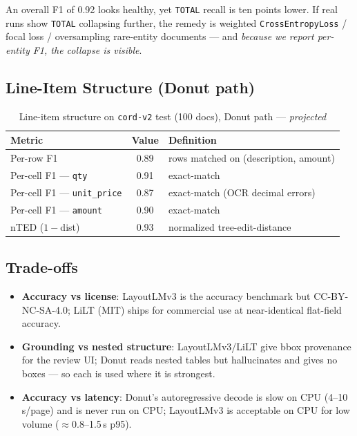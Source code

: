 \documentclass[12pt,a4paper]{article}
\begin{document}
An overall F1 of 0.92 looks healthy, yet \texttt{TOTAL} recall is ten points lower. If
real runs show \texttt{TOTAL} collapsing further, the remedy is weighted
\texttt{CrossEntropyLoss} / focal loss / oversampling rare-entity documents --- and
\emph{because we report per-entity F1, the collapse is visible}.

\subsection{Line-Item Structure (Donut path)}

\begin{table}[H]
\centering
\caption{Line-item structure on \texttt{cord-v2} test (100 docs), Donut path --- \emph{projected}}
\begin{tabular}{lcl}
\toprule
\textbf{Metric} & \textbf{Value} & \textbf{Definition} \\
\midrule
Per-row F1            & 0.89 & rows matched on (description, amount) \\
Per-cell F1 --- \texttt{qty}        & 0.91 & exact-match \\
Per-cell F1 --- \texttt{unit\_price}& 0.87 & exact-match (OCR decimal errors) \\
Per-cell F1 --- \texttt{amount}     & 0.90 & exact-match \\
nTED ($1-$dist)        & 0.93 & normalized tree-edit-distance \\
\bottomrule
\end{tabular}
\end{table}

\subsection{Trade-offs}

\begin{itemize}\setlength\itemsep{0.15em}
  \item \textbf{Accuracy vs license}: LayoutLMv3 is the accuracy benchmark but CC-BY-NC-SA-4.0; LiLT (MIT) ships for commercial use at near-identical flat-field accuracy.
  \item \textbf{Grounding vs nested structure}: LayoutLMv3/LiLT give bbox provenance for the review UI; Donut reads nested tables but hallucinates and gives no boxes --- so each is used where it is strongest.
  \item \textbf{Accuracy vs latency}: Donut's autoregressive decode is slow on CPU (4--10\,s/page) and is never run on CPU; LayoutLMv3 is acceptable on CPU for low volume ($\approx$0.8--1.5\,s p95).
\end{itemize}
\end{document}
